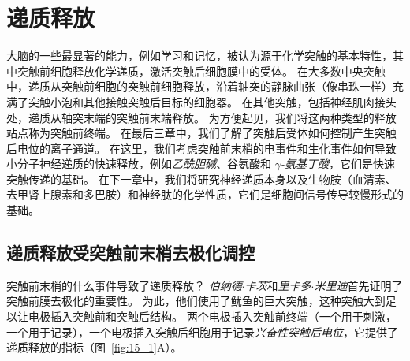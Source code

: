 \chapter{递质释放} \label{chap:chap15}

大脑的一些最显著的能力，例如学习和记忆，被认为源于化学突触的基本特性，其中突触前细胞释放化学递质，激活突触后细胞膜中的受体。
在大多数中央突触中，递质从突触前细胞的突触前细胞释放，沿着轴突的静脉曲张（像串珠一样）充满了突触小泡和其他接触突触后目标的细胞器。
在其他突触，包括神经肌肉接头处，递质从轴突末端的突触前末端释放。
为方便起见，我们将这两种类型的释放站点称为突触前终端。
在最后三章中，我们了解了突触后受体如何控制产生突触后电位的离子通道。
在这里，我们考虑突触前末梢的电事件和生化事件如何导致小分子神经递质的快速释放，例如\textit{乙酰胆碱}、谷氨酸和 \textit{$\gamma$-氨基丁酸}，它们是快速突触传递的基础。
在下一章中，我们将研究神经递质本身以及生物胺（血清素、去甲肾上腺素和多巴胺）和神经肽的化学性质，它们是细胞间信号传导较慢形式的基础。



\section{递质释放受突触前末梢去极化调控}

突触前末梢的什么事件导致了递质释放？
\textit{伯纳德$\cdot$卡茨}和\textit{里卡多$\cdot$米里迪}首先证明了突触前膜去极化的重要性。
为此，他们使用了鱿鱼的巨大突触，这种突触大到足以让电极插入突触前和突触后结构。
两个电极插入突触前终端（一个用于刺激，一个用于记录），一个电极插入突触后细胞用于记录\textit{兴奋性突触后电位}，它提供了递质释放的指标（图~\ref{fig:15_1}A）。


